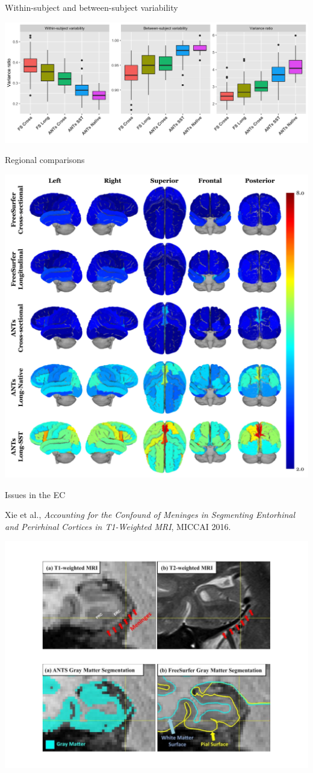 \documentclass[ignorenonframetext,]{beamer}
\begin{document}
\begin{frame}{Within-subject and between-subject variability}

\centering
\includegraphics[width=0.99 \textwidth]{../Figures/allData_FINAL.png}

\end{frame}

\begin{frame}{Regional comparisons}

\centering
\includegraphics[width=0.65 \textwidth]{../Figures/medianRatios3D.pdf}

\end{frame}

\begin{frame}{Issues in the EC}

Xie et al., \emph{Accounting for the Confound of Meninges in Segmenting
Entorhinal and Perirhinal Cortices in T1-Weighted MRI}, MICCAI 2016.

\centering
\includegraphics[width=0.7 \textwidth]{../Figures/LongXie.pdf}

\hypertarget{refs}{}

\end{frame}
\end{document}
